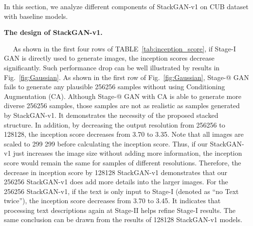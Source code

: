 \documentclass[10pt,journal,letterpaper,compsoc]{IEEEtran}
\makeatletter
\newcommand{\Rmnum}[1]{\expandafter\@slowromancap\romannumeral #1@}
\makeatother
\begin{document}
In this section, we analyze different components of StackGAN-v1 on CUB dataset with baseline models.  

\textbf{The design of StackGAN-v1.}
{　
As shown in the first four rows of TABLE~\ref{tab:inception_score}, if Stage-I GAN is directly used to generate images, the inception scores decrease significantly. Such performance drop can be well illustrated by results in Fig.~\ref{fig:Gaussian}. As shown in the first row of Fig.~\ref{fig:Gaussian}, Stage-\Rmnum{1} GAN fails to generate any plausible 256256 samples without using Conditioning Augmentation (CA). Although Stage-\Rmnum{1} GAN with CA is able to generate more diverse 256256 samples, those samples are not as realistic as samples generated by StackGAN-v1. It demonstrates the necessity of the proposed stacked structure. In addition, by decreasing the output resolution from 256256 to 128128, the inception score decreases from 3.70 to 3.35. Note that all images are scaled to 299  299 before calculating the inception score. Thus, if our StackGAN-v1 just increases the image size without adding more information, the inception score would remain the same for samples of different resolutions. Therefore, the decrease in inception score by 128128 StackGAN-v1 demonstrates that our 256256 StackGAN-v1 does add more details into the larger images. For the 256256 StackGAN-v1, if the text is only input to Stage-I (denoted as ``no Text twice''), the inception score decreases from 3.70 to 3.45. It indicates that processing text descriptions again at Stage-II helps refine Stage-I results. The same conclusion can be drawn from the results of 128128 StackGAN-v1 models. 


}
\end{document}
